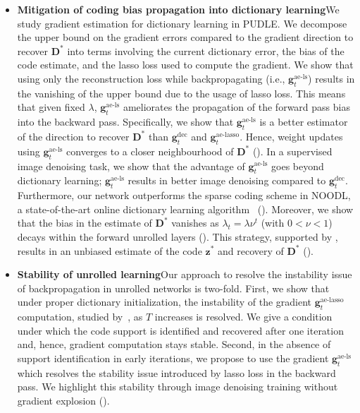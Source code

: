 \documentclass[10pt]{article} %
\newcommand{\D}{{\bm D}}
\newcommand{\z}{{\bm z}}
\newcommand{\g}{{\bm g}}
\begin{document}
\begin{itemize}[noitemsep, topsep=0pt, leftmargin=12pt]
\item {\bf Mitigation of coding bias propagation into dictionary learning}\quad We study gradient estimation for dictionary learning in PUDLE. We decompose the upper bound on the gradient errors compared to the gradient direction to recover $\D^{\ast}$ into terms involving the current dictionary error, the bias of the code estimate, and the lasso loss used to compute the gradient. We show that using only the reconstruction loss while backpropagating (i.e., $\g_t^{\text{ae-ls}}$) results in the vanishing of the upper bound due to the usage of lasso loss. This means that given fixed $\lambda$, $\g_t^{\text{ae-ls}}$ ameliorates the propagation of the forward pass bias into the backward pass. Specifically, we show that $\g_t^{\text{ae-ls}}$ is a better estimator of the direction to recover $\D^{\ast}$ than $\g_t^{\text{dec}}$ and $\g_t^{\text{ae-lasso}}$. Hence, weight updates using $\g_t^{\text{ae-ls}}$ converges to a closer neighbourhood of $\D^{\ast}$ (). In a supervised image denoising task, we show that the advantage of $\g_t^{\text{ae-ls}}$ goes beyond dictionary learning; $\g_t^{\text{ae-ls}}$ results in better image denoising compared to $\g_t^{\text{dec}}$. Furthermore, our network outperforms the sparse coding scheme in NOODL, a state-of-the-art online dictionary learning algorithm~\citep{rambhatla2018noodl} (). Moreover, we show that the bias in the estimate of $\D^{\ast}$ vanishes as $\lambda_t = \lambda \nu^t$ (with $0 <\nu < 1$) decays within the forward unrolled layers (). This strategy, supported by , results in an unbiased estimate of the code $\z^{\ast}$ and recovery of $\D^{\ast}$ ().
%
\item {\bf Stability of unrolled learning}\quad Our approach to resolve the instability issue of backpropagation in unrolled networks is two-fold. First, we show that under proper dictionary initialization, the instability of the gradient $\g_t^{\text{ae-lasso}}$ computation, studied by~\citet{malezieux2022understanding}, as $T$ increases is resolved. We give a condition under which the code support is identified and recovered after one iteration and, hence, gradient computation stays stable. Second, in the absence of support identification in early iterations, we propose to use the gradient $\g_t^{\text{ae-ls}}$ which resolves the stability issue introduced by lasso loss in the backward pass. We highlight this stability through image denoising training without gradient explosion ().

\end{itemize}
\end{document}
